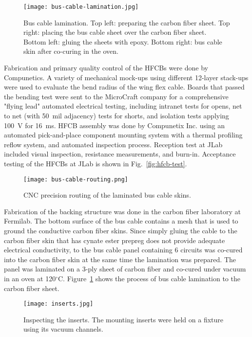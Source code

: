 \begin{figure}[h] 
\centering 
\texttt{[image: bus-cable-lamination.jpg]}
\caption{Bus cable lamination. Top left: preparing the carbon fiber sheet. Top right: placing the bus cable sheet over
  the carbon fiber sheet. Bottom left: gluing the sheets with epoxy. Bottom right: bus cable skin after co-curing in the
  oven.}
\label{fig:bus-cable-lamination}
\end{figure}

Fabrication and primary quality control of the HFCBs were done by Compunetics. A variety of mechanical mock-ups
using different 12-layer stack-ups were used to evaluate the bend radius of the wing flex cable. Boards that passed
the bending test were sent to the MicroCraft company for a comprehensive "flying lead" automated electrical testing,
including intranet tests for opens, net to net (with 50~mil adjacency) tests for shorts, and isolation tests applying
100~V for 16~ms. HFCB assembly was done by Compunetix Inc. using an automated pick-and-place component mounting
system with a thermal profiling reflow system, and automated inspection process. Reception test at JLab included
visual inspection, resistance measurements, and burn-in. Acceptance testing of the HFCBs at JLab is shown in
Fig.~\ref{fig:hfcb-test}. 

\begin{figure}[h] 
\centering 
\texttt{[image: bus-cable-routing.png]}
\caption{CNC precision routing of the laminated bus cable skins.}
\label{fig:bus-cable-routing}
\end{figure}

Fabrication of the backing structure was done in the carbon fiber laboratory at Fermilab. The bottom surface of
the bus cable contains a mesh that is used to ground the conductive carbon fiber skins. Since simply gluing the
cable to the carbon fiber skin that has cynate ester prepreg does not provide adequate electrical conductivity, to
the bus cable panel containing 6 circuits was co-cured into the carbon fiber skin at the same time the lamination was
prepared. The panel was laminated on a 3-ply sheet of carbon fiber and co-cured under vacuum in an oven at
120$^\circ$C. Figure~\ref{fig:bus-cable-lamination} shows the process of bus cable lamination to the carbon fiber
sheet.

\begin{figure}[h] 
\centering 
\texttt{[image: inserts.jpg]}
\caption{Inspecting the inserts. The mounting inserts were held on a fixture using its vacuum channels.}
\label{fig:inserts}
\end{figure}

